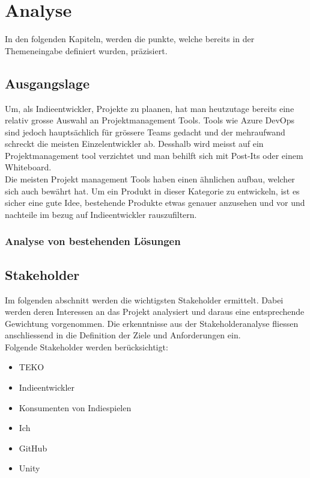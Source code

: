 \section{Analyse}
In den folgenden Kapiteln, werden die punkte, welche bereits in der Themeneingabe
definiert wurden, präzisiert.

\subsection{Ausgangslage}
Um, als Indieentwickler, Projekte zu plaanen, hat man heutzutage bereits eine relativ grosse Auswahl an
Projektmanagement Tools.
Tools wie Azure DevOps sind jedoch hauptsächlich für grössere Teams gedacht und der mehraufwand schreckt die meisten Einzelentwickler ab.
Desshalb wird meisst auf ein Projektmanagement tool verzichtet und man behilft sich mit Post-Its oder einem Whiteboard.\\
Die meisten Projekt management Tools haben einen ähnlichen aufbau, welcher sich auch bewährt hat.
Um ein Produkt in dieser Kategorie zu entwickeln, ist es sicher eine gute Idee, bestehende Produkte etwas genauer anzusehen und vor und nachteile 
im bezug auf Indieentwickler rauszufiltern.

\subsubsection{Analyse von bestehenden Lösungen}


\newpage

\newpage

\subsection{Stakeholder}

Im folgenden abschnitt werden die wichtigsten Stakeholder ermittelt.
Dabei werden deren Interessen an das Projekt analysiert und daraus eine entsprechende Gewichtung vorgenommen.
Die erkenntnisse aus der Stakeholderanalyse fliessen anschliessend in die
Definition der Ziele und Anforderungen ein.\\
Folgende Stakeholder werden berücksichtigt:\\

\begin{itemize}
    \item TEKO
    \item Indieentwickler
    \item Konsumenten von Indiespielen
    \item Ich
    \item GitHub
    \item Unity
\end{itemize}
\newpage

